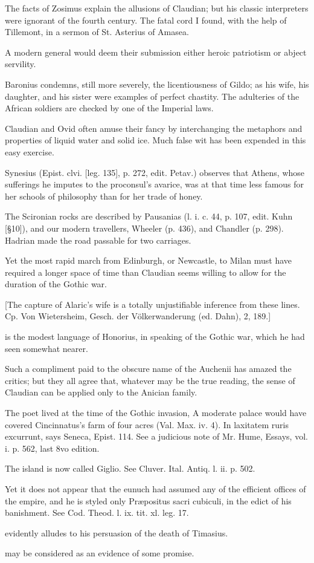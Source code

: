 The facts of Zosimus explain the allusions of Claudian; but his classic interpreters were ignorant of the fourth century. The fatal cord I found, with the help of Tillemont, in a sermon of St. Asterius of Amasea.

A modern general would deem their submission either heroic patriotism or abject servility.

Baronius condemns, still more severely, the licentiousness of Gildo; as his wife, his daughter, and his sister were examples of perfect chastity. The adulteries of the African soldiers are checked by one of the Imperial laws.

Claudian and Ovid often amuse their fancy by interchanging the metaphors and properties of liquid water and solid ice. Much false wit has been expended in this easy exercise.

Synesius (Epist. clvi. [leg. 135], p. 272, edit. Petav.) observes that Athens, whose sufferings he imputes to the proconsul\texthebrew{}’s avarice, was at that time less famous for her schools of philosophy than for her trade of honey.

The Scironian rocks are described by Pausanias (l. i. c. 44, p. 107, edit. Kuhn [§10]), and our modern travellers, Wheeler (p. 436), and Chandler (p. 298). Hadrian made the road passable for two carriages.

Yet the most rapid march from Edinburgh, or Newcastle, to Milan must have required a longer space of time than Claudian seems willing to allow for the duration of the Gothic war.

[The capture of Alaric\texthebrew{}’s wife is a totally unjustifiable inference from these lines. Cp. Von Wietersheim, Gesch. der Völkerwanderung (ed. Dahn), 2, 189.]

is the modest language of Honorius, in speaking of the Gothic war, which he had seen somewhat nearer.

Such a compliment paid to the obscure name of the Auchenii has amazed the critics; but they all agree that, whatever may be the true reading, the sense of Claudian can be applied only to the Anician family.

The poet lived at the time of the Gothic invasion, A moderate palace would have covered Cincinnatus\texthebrew{}’s farm of four acres (Val. Max. iv. 4). In laxitatem ruris excurrunt, says Seneca, Epist. 114. See a judicious note of Mr. Hume, Essays, vol. i. p. 562, last 8vo edition.

The island is now called Giglio. See Cluver. Ital. Antiq. l. ii. p. 502.

Yet it does not appear that the eunuch had assumed any of the efficient offices of the empire, and he is styled only Præpositus sacri cubiculi, in the edict of his banishment. See Cod. Theod. l. ix. tit. xl. leg. 17.

evidently alludes to his persuasion of the death of Timasius.

may be considered as an evidence of some promise.
